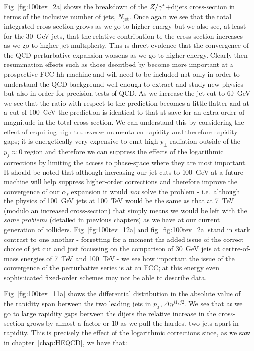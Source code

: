 	Fig~\eqref{fig:100tev_2a} shows the breakdown of the $Z/\gamma^*$+dijets cross-section in terms of the inclusive number
	of jets, $N_{\text{jet}}$.  Once again we see that the total integrated cross-section grows as we
	go to higher energy but we also see, at least for the 30~GeV jets, that the relative contribution to the cross-section
	increases as we go to higher jet multiplicity.  This is direct evidence that the convergence of the
	QCD perturbative expansion worsens as we go to higher energy.  Clearly then resummation effects
	such as those described by \hej become more important at a prospective FCC-hh machine and will need
	to be included not only in order to understand the QCD background well enough to extract and
	study new physics but also in order for precision tests of QCD.  As we increase the jet cut to 60~GeV
	we see that the ratio with respect to the \stev prediction becomes a little flatter and at a cut of 100~GeV
	the prediction is identical to that at \stev save for an extra order of magnitude in the total cross-section.
	We can understand this by considering the effect of requiring high transverse momenta on rapidity and therefore
	rapidity gaps; it is energetically very expensive to emit high $p_\perp$ radiation outside of the $y_j\approx0$ region
	and therefore we can suppress the effects of the logarithmic corrections by limiting the access to phase-space
	where they are most important.  It should be noted that although increasing our jet cuts to 100~GeV at a future
	machine will help suppress higher-order corrections and therefore improve the convergence of our $\alpha_s$ expansion
	it would \emph{not} solve the problem - i.e.~although the physics of 100~GeV jets at 100~TeV would be the same as that at 7~TeV
	(modulo an increased cross-section) that simply means we would be left with the \emph{same problems} (detailed in previous
	chapters) as we have at our current generation of colliders.  Fig~\eqref{fig:100tev_12a} and fig~\eqref{fig:100tev_2a} stand
	in stark contrast to one another - forgetting for a moment the added issue of the correct choice of jet cut and just focussing
	on the comparison of 30~GeV jets at centre-of-mass energies of 7~TeV and 100~TeV - we see how important the
	issue of the convergence of the perturbative series is at an FCC; at this energy even sophisticated fixed-order
	schemes may not be able to describe data.

	Fig~\eqref{fig:100tev_11a} shows the differential distribution in the absolute value of the
	rapidity span between the two leading jets in $p_T$, $\Delta y^{j1, j2}$.  We see that as we go to
	large rapidity gaps between the dijets the relative increase in the cross-section grows by almost a
	factor or $10$ as we pull the hardest two jets apart in rapidity.  This is precisely the effect of
	the logarithmic corrections since, as we saw in chapter~\ref{chap:HEQCD}, we have that:

